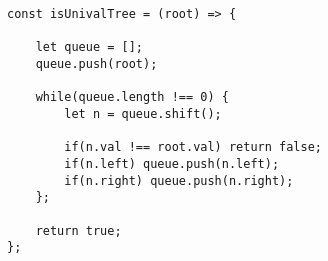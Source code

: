 \documentclass[10pt]{article}
\begin{document}
\begin{lstlisting}[title=Solution isUnivalTree, captionpos=t]
const isUnivalTree = (root) => {
    
    let queue = [];
    queue.push(root);
    
    while(queue.length !== 0) {
        let n = queue.shift();
        
        if(n.val !== root.val) return false;
        if(n.left) queue.push(n.left);
        if(n.right) queue.push(n.right);
    };    
    
    return true;
};
\end{lstlisting}

\medskip %
\end{document}
